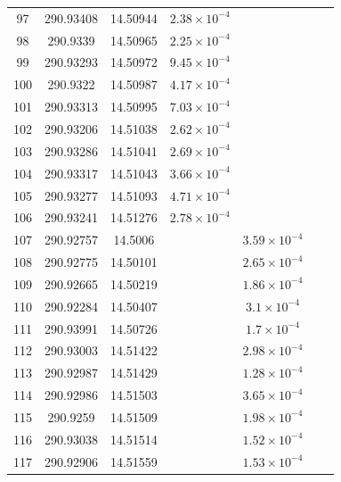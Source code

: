 \begin{table}
\begin{tabular}{ccccccc}
97 & 290.93408 & 14.50944 & $2.38\times10^{-4}$ &  &  &  \\
98 & 290.9339 & 14.50965 & $2.25\times10^{-4}$ &  &  &  \\
99 & 290.93293 & 14.50972 & $9.45\times10^{-4}$ &  &  &  \\
100 & 290.9322 & 14.50987 & $4.17\times10^{-4}$ &  &  &  \\
101 & 290.93313 & 14.50995 & $7.03\times10^{-4}$ &  &  &  \\
102 & 290.93206 & 14.51038 & $2.62\times10^{-4}$ &  &  &  \\
103 & 290.93286 & 14.51041 & $2.69\times10^{-4}$ &  &  &  \\
104 & 290.93317 & 14.51043 & $3.66\times10^{-4}$ &  &  &  \\
105 & 290.93277 & 14.51093 & $4.71\times10^{-4}$ &  &  &  \\
106 & 290.93241 & 14.51276 & $2.78\times10^{-4}$ &  &  &  \\
107 & 290.92757 & 14.5006 &  & $3.59\times10^{-4}$ &  &  \\
108 & 290.92775 & 14.50101 &  & $2.65\times10^{-4}$ &  &  \\
109 & 290.92665 & 14.50219 &  & $1.86\times10^{-4}$ &  &  \\
110 & 290.92284 & 14.50407 &  & $3.1\times10^{-4}$ &  &  \\
111 & 290.93991 & 14.50726 &  & $1.7\times10^{-4}$ &  &  \\
112 & 290.93003 & 14.51422 &  & $2.98\times10^{-4}$ &  &  \\
113 & 290.92987 & 14.51429 &  & $1.28\times10^{-4}$ &  &  \\
114 & 290.92986 & 14.51503 &  & $3.65\times10^{-4}$ &  &  \\
115 & 290.9259 & 14.51509 &  & $1.98\times10^{-4}$ &  &  \\
116 & 290.93038 & 14.51514 &  & $1.52\times10^{-4}$ &  &  \\
117 & 290.92906 & 14.51559 &  & $1.53\times10^{-4}$ &  &  \\
\end{tabular}
\end{table}
